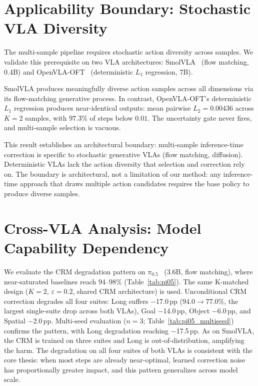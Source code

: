 
\appendix

\section{Applicability Boundary: Stochastic VLA Diversity}
\label{sec:applicability}

 The multi-sample pipeline requires stochastic action diversity across samples. We validate this prerequisite on two VLA architectures: SmolVLA~\cite{shukor2025smolvla} (flow matching, 0.4B) and OpenVLA-OFT~\cite{kim2024openvla} (deterministic $L_1$ regression, 7B).

SmolVLA produces meaningfully diverse action samples across all dimensions via its flow-matching generative process. In contrast, OpenVLA-OFT's deterministic $L_1$ regression produces near-identical outputs: mean pairwise $L_2{=}0.00436$ across $K{=}2$ samples, with $97.3$\% of steps below $0.01$. The uncertainty gate never fires, and multi-sample selection is vacuous.

This result establishes an architectural boundary: multi-sample inference-time correction is specific to stochastic generative VLAs (flow matching, diffusion). Deterministic VLAs lack the action diversity that selection and correction rely on. The boundary is architectural, not a limitation of our method: any inference-time approach that draws multiple action candidates requires the base policy to produce diverse samples.

\section{Cross-VLA Analysis: Model Capability Dependency}
\label{sec:cross_vla}

 We evaluate the CRM degradation pattern on $\pi_{0.5}$~\cite{black2025pi05} (3.6B, flow matching), where near-saturated baselines reach 94--98\% (Table~\ref{tab:pi05}). The same K-matched design ($K{=}2$, $\varepsilon{=}0.2$, shared CRM architecture) is used. Unconditional CRM correction degrades all four suites: Long suffers $-$17.0\,pp ($94.0{\to}77.0$\%, the largest single-suite drop across both VLAs), Goal $-$14.0\,pp, Object $-$6.0\,pp, and Spatial $-$2.0\,pp. Multi-seed evaluation ($n{=}3$; Table~\ref{tab:pi05_multiseed}) confirms the pattern, with Long degradation reaching $-$17.5\,pp. As on SmolVLA, the CRM is trained on three suites and Long is out-of-distribution, amplifying the harm. The degradation on all four suites of both VLAs is consistent with the core thesis: when most steps are already near-optimal, learned correction noise has proportionally greater impact, and this pattern generalizes across model scale.

